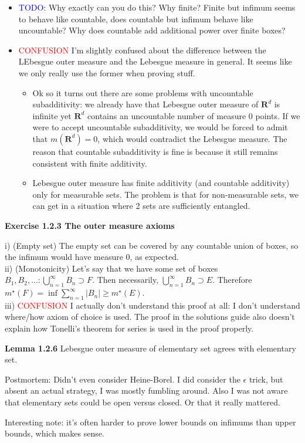\documentclass[answers,12pt]{exam}
\begin{document}
\begin{itemize}
    \item \textcolor{blue}{TODO}: Why exactly can you do this? 
    Why finite? 
    Finite but infimum seems to behave like countable, does countable but infimum behave like uncountable?
    Why does countable add additional power over finite boxes?
    \item \textcolor{red}{CONFUSION} I'm slightly confused about the difference between the LEbesgue outer measure and the Lebesgue measure in general. 
    It seems like we only really use the former when proving stuff.
    \begin{itemize}
        \item Ok so it turns out there are some problems with uncountable subadditivity:
        we already have that Lebesgue outer measure of $\mathbf{R}^d$ is infinite yet $\mathbf{R}^d$ contains an uncountable number of measure 0 points.
        If we were to accept uncountable subadditivity, we would be forced to admit that $m(\mathbf{R}^d)=0$, which would contradict the Lebesgue measure. 
        The reason that countable subadditivity is fine is because it still remains consistent with finite additivity.
        \item Lebesgue outer measure has finite additivity (and countable additivity) only for measurable sets.
        The problem is that for non-measurable sets, we can get in a situation where 2 sets are sufficiently entangled.
        
    \end{itemize}
\end{itemize}

\textbf{Exercise 1.2.3 The outer measure axioms}
\begin{solution}
    i) (Empty set) The empty set can be covered by any countable union of boxes, so the infimum would have measure 0, as expected.\\
    ii) (Monotonicity) Let's say that we have some set of boxes $B_1, B_2, ... : \bigcup_{n=1}^{\infty}B_n \supset F$.
    Then necessarily, $\bigcup_{n=1}^{\infty}B_n \supset E$.
    Therefore $m^{\star}(F) = \inf \sum_{n=1}^{\infty}|B_n| \geq m^{\star}(E)$.\\
    iii) \textcolor{red}{CONFUSION} I actually don't understand this proof at all: I don't understand where/how axiom of choice is used.
    The proof in the solutions guide also doesn't explain how Tonelli's theorem for series is used in the proof properly.
\end{solution}
\textbf{Lemma 1.2.6} Lebesgue outer measure of elementary set agrees with elementary set.
\begin{solution}
    Postmortem:
    Didn't even consider Heine-Borel.
    I did consider the $\epsilon$ trick, but absent an actual strategy, I was mostly fumbling around.
    Also I was not aware that elementary sets could be open versus closed.
    Or that it really mattered.
\end{solution}
Interesting note: it's often harder to prove lower bounds on infimums than upper bounds, which makes sense.
\end{document}
